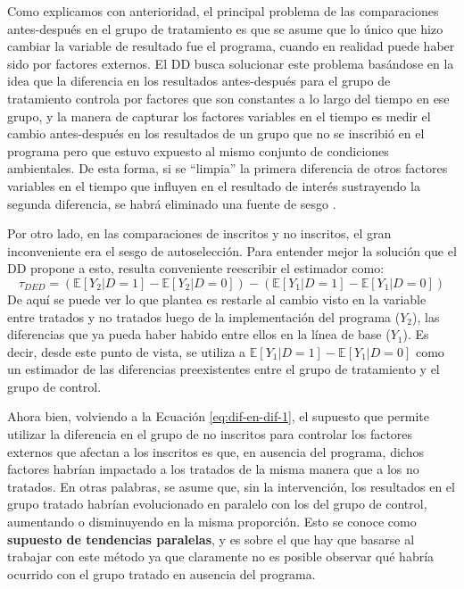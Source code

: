 \documentclass[../../main.tex]{subfiles}
\begin{document}
Como explicamos con anterioridad, el principal problema de las comparaciones antes-después
en el grupo de tratamiento es que se asume que lo único que hizo cambiar la variable de
resultado fue el programa, cuando en realidad puede haber sido por factores externos. El
DD busca solucionar este problema basándose en la idea que la diferencia en los resultados
antes-después para el grupo de tratamiento controla por factores que son constantes a lo
largo del tiempo en ese grupo, y la manera de capturar los factores variables en el tiempo
es medir el cambio antes-después en los resultados de un grupo que no se inscribió en el
programa pero que estuvo expuesto al mismo conjunto de condiciones ambientales. De esta
forma, si se ``limpia'' la primera diferencia de otros factores variables en el tiempo que
influyen en el resultado de interés sustrayendo la segunda diferencia, se habrá eliminado
una fuente de sesgo \cite{gertler-2016}.

Por otro lado, en las comparaciones de inscritos y no inscritos, el gran inconveniente era
el sesgo de autoselección. Para entender mejor la solución que el DD propone a esto,
resulta conveniente reescribir el estimador como:
\begin{equation}
    \tau_{DED} = 
        \left(
            \mathbb{E}\left[Y_2|D=1\right] - \mathbb{E}\left[Y_2|D=0\right]
        \right) -
        \left(
            \mathbb{E}\left[Y_1|D=1\right] - \mathbb{E}\left[Y_1|D=0\right]
        \right)
        \label{eq:dif-en-dif-2}
\end{equation}
De aquí se puede ver lo que plantea es restarle al cambio visto en la variable entre
tratados y no tratados luego de la implementación del programa (\(Y_2\)), las diferencias
que ya pueda haber habido entre ellos en la línea de base (\(Y_1\)). Es decir, desde este
punto de vista, se utiliza a \(\mathbb{E}\left[Y_1|D=1\right] -
\mathbb{E}\left[Y_1|D=0\right]\) como un estimador de las diferencias preexistentes entre
el grupo de tratamiento y el grupo de control.

Ahora bien, volviendo a la Ecuación \ref{eq:dif-en-dif-1}, el supuesto que permite
utilizar la diferencia en el grupo de no inscritos para controlar los factores externos
que afectan a los inscritos es que, en ausencia del programa, dichos factores habrían
impactado a los tratados de la misma manera que a los no tratados. En otras palabras, se
asume que, sin la intervención, los resultados en el grupo tratado habrían evolucionado en
paralelo con los del grupo de control, aumentando o disminuyendo en la misma proporción.
Esto se conoce como \textbf{supuesto de tendencias paralelas}, y es sobre el que hay que
basarse al trabajar con este método ya que claramente no es posible observar qué habría
ocurrido con el grupo tratado en ausencia del programa.
\end{document}

